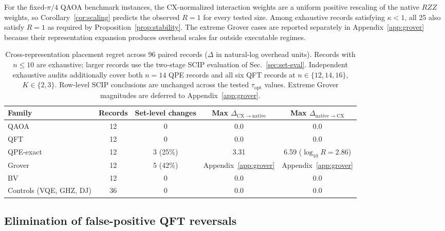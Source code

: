 \documentclass[
  aps,
  pra,
  reprint,
  amsmath,
  amssymb,
  longbibliography,
  nofootinbib,
  floatfix
]{revtex4-2}
\theoremstyle{plain}
\newcommand{\tabfitstar}[1]{{\footnotesize #1}}
\begin{document}
For the fixed-$\pi/4$ QAOA benchmark instances, the CX-normalized interaction weights are a uniform positive rescaling of the native $RZZ$ weights, so Corollary~\ref{cor:scaling} predicts the observed $R=1$ for every tested size. Among exhaustive records satisfying $\kappa<1$, all 25 also satisfy $R=1$ as required by Proposition~\ref{prop:stability}. The extreme Grover cases are reported separately in Appendix~\ref{app:grover} because their representation expansion produces overhead scales far outside executable regimes.

\begin{table}[tp]
\centering
\caption{Cross-representation placement regret across 96 paired records ($\Delta$ in natural-log overhead units). Records with $n\le10$ are exhaustive; larger records use the two-stage SCIP evaluation of Sec.~\ref{sec:set-eval}. Independent exhaustive audits additionally cover both $n=14$ QPE records and all six QFT records at $n\in\{12,14,16\}$, $K\in\{2,3\}$. Row-level SCIP conclusions are unchanged across the tested $\tau_{\mathrm{opt}}$ values. Extreme Grover magnitudes are deferred to Appendix~\ref{app:grover}.}
\label{tab:e12_regret}
\tabfitstar{%
\begin{tabular*}{\textwidth}{@{\extracolsep{\fill}}lcccc@{}}
\toprule
\textbf{Family} & \textbf{Records} & \textbf{Set-level changes} & \textbf{Max $\Delta_{\mathrm{CX}\to\mathrm{native}}$} & \textbf{Max $\Delta_{\mathrm{native}\to\mathrm{CX}}$}\\
\midrule
QAOA                          & 12 & 0 & 0.0 & 0.0\\
QFT                           & 12 & 0 & 0.0 & 0.0\\
QPE-exact                     & 12 & 3 (25\%) & 3.31 & 6.59 ($\log_{10}\!R\!=\!2.86$)\\
Grover                        & 12 & 5 (42\%) & Appendix~\ref{app:grover} & Appendix~\ref{app:grover}\\
BV                            & 12 & 0 & 0.0 & 0.0\\
Controls (VQE, GHZ, DJ)       & 36 & 0 & 0.0 & 0.0\\
\bottomrule
\end{tabular*}
}
\end{table}

\subsection{Elimination of false-positive QFT reversals}
\label{sec:results-qft}
\end{document}
